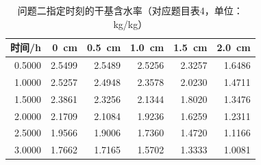 \begin{table}[htbp]
\centering\small
\caption{问题二指定时刻的干基含水率（对应题目表4，单位：kg/kg）}\label{tab:paper4}
\begin{tabular}{rrrrrr}
\toprule
时间/h & 0~cm & 0.5~cm & 1.0~cm & 1.5~cm & 2.0~cm \\
\midrule
0.5000 & 2.5499 & 2.5489 & 2.5256 & 2.3257 & 1.6486 \\
1.0000 & 2.5257 & 2.4948 & 2.3578 & 2.0230 & 1.4711 \\
1.5000 & 2.3861 & 2.3256 & 2.1344 & 1.8020 & 1.3476 \\
2.0000 & 2.1709 & 2.1084 & 1.9236 & 1.6259 & 1.2311 \\
2.5000 & 1.9566 & 1.9006 & 1.7360 & 1.4720 & 1.1166 \\
3.0000 & 1.7662 & 1.7165 & 1.5702 & 1.3333 & 1.0081 \\
\bottomrule
\end{tabular}
\end{table}

